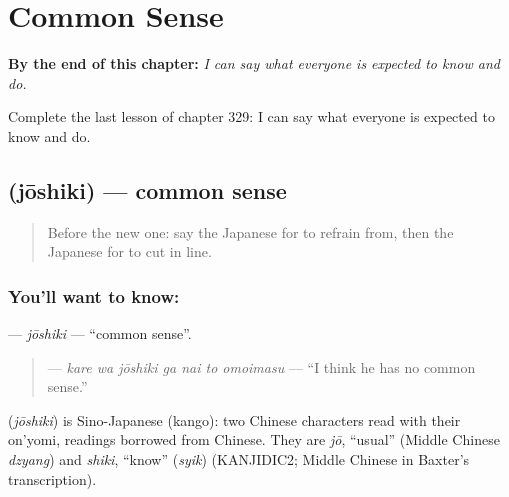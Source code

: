 
\chapter{Common Sense}
\label{ch:ja-common-sense}

\begin{chapteropening}
\textbf{By the end of this chapter:} \emph{I can say what everyone is expected to know and do.}

Complete the last lesson of chapter 329: I can say what everyone is expected to know and do.
\end{chapteropening}

\section[\texorpdfstring{\ja{じょうしき} (jōshiki)}{じょうしき (jōshiki)}]{ (jōshiki) — common sense}

\label{lesson:JA-C329-joushiki}



\begin{quote}
Before the new one: say the Japanese for to refrain from, then the Japanese for to cut in line.
\end{quote}

\subsection*{You'll want to know: }
\textbf{} — \emph{jōshiki} — \textquotedblleft{}common sense\textquotedblright{}.

\begin{quote}
\textbf{   } — \emph{kare wa jōshiki ga nai to omoimasu} — \textquotedblleft{}I think he has no common sense.\textquotedblright{}
\end{quote}

\begin{cousinweb}
\textbf{} (\emph{jōshiki}) is Sino-Japanese (kango): two Chinese characters read with their on'yomi, readings borrowed from Chinese. They are \emph{jō}, \textquotedblleft{}usual\textquotedblright{} (Middle Chinese \emph{dzyang}) and \emph{shiki}, \textquotedblleft{}know\textquotedblright{} (\emph{syik}) (KANJIDIC2; Middle Chinese in Baxter's transcription).
\end{cousinweb}

